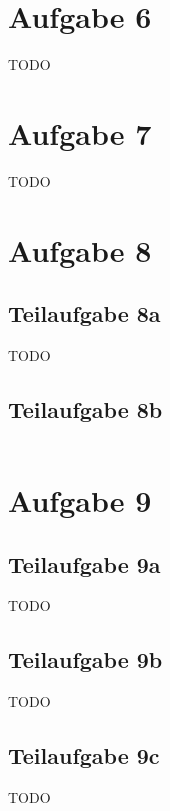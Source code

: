 \documentclass[a4paper]{scrartcl}
\begin{document}
\section*{Aufgabe 6}
TODO

\section*{Aufgabe 7}
TODO

\section*{Aufgabe 8}
\subsection*{Teilaufgabe 8a}
TODO

\subsection*{Teilaufgabe 8b}
\inputminted[linenos, numbersep=5pt, tabsize=4, frame=lines, label=shader.frag]{glsl}{shader.frag}

\section*{Aufgabe 9}
\subsection*{Teilaufgabe 9a}
TODO
\subsection*{Teilaufgabe 9b}
TODO
\subsection*{Teilaufgabe 9c}
TODO
\end{document}
